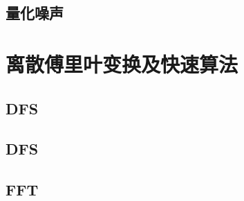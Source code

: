 \documentclass[en,11pt,english,black,simple,device=ppt]{elegantbook}
\begin{document}


\section{量化噪声}



\chapter{离散傅里叶变换及快速算法}

\section{DFS}



\section{DFS}



\section{FFT}


\end{document}
